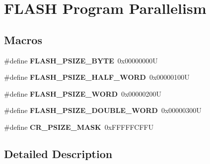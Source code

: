\hypertarget{group___f_l_a_s_h___program___parallelism}{}\section{F\+L\+A\+SH Program Parallelism}
\label{group___f_l_a_s_h___program___parallelism}
\subsection*{Macros}
\begin{DoxyCompactItemize}
\item 
\mbox{\label{group___f_l_a_s_h___program___parallelism_ga83c67710aa697216193654e1e90cc953}} 
\#define {\bfseries F\+L\+A\+S\+H\+\_\+\+P\+S\+I\+Z\+E\+\_\+\+B\+Y\+TE}~0x00000000U
\item 
\mbox{\label{group___f_l_a_s_h___program___parallelism_gad3210ba7423b45cb3063f4294cdeab16}} 
\#define {\bfseries F\+L\+A\+S\+H\+\_\+\+P\+S\+I\+Z\+E\+\_\+\+H\+A\+L\+F\+\_\+\+W\+O\+RD}~0x00000100U
\item 
\mbox{\label{group___f_l_a_s_h___program___parallelism_gac3ac337ed43efc869a9f734527e44673}} 
\#define {\bfseries F\+L\+A\+S\+H\+\_\+\+P\+S\+I\+Z\+E\+\_\+\+W\+O\+RD}~0x00000200U
\item 
\mbox{\label{group___f_l_a_s_h___program___parallelism_ga0fd17c4e281f199f09a6a6365e9243ee}} 
\#define {\bfseries F\+L\+A\+S\+H\+\_\+\+P\+S\+I\+Z\+E\+\_\+\+D\+O\+U\+B\+L\+E\+\_\+\+W\+O\+RD}~0x00000300U
\item 
\mbox{\label{group___f_l_a_s_h___program___parallelism_ga7c755f15e36221021a1438857e40365c}} 
\#define {\bfseries C\+R\+\_\+\+P\+S\+I\+Z\+E\+\_\+\+M\+A\+SK}~0x\+F\+F\+F\+F\+F\+C\+F\+FU
\end{DoxyCompactItemize}


\subsection{Detailed Description}

